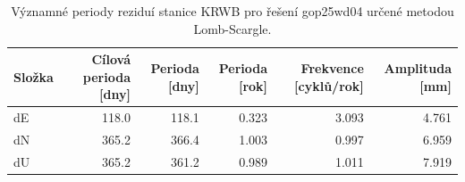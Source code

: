 \begin{table}[H]
\centering
\caption{Významné periody reziduí stanice KRWB pro řešení gop25wd04 určené metodou Lomb-Scargle.}
\label{tab:gop25wd04_stcd_krwb_detr_weighted_multiseg_spectral_lomb_scargle_significant_periods}
\begin{tabular}{lrrrrr}
\toprule
Složka & Cílová perioda [dny] & Perioda [dny] & Perioda [rok] & Frekvence [cyklů/rok] & Amplituda [mm] \\
\midrule
dE & 118.0 & 118.1 & 0.323 & 3.093 & 4.761 \\
dN & 365.2 & 366.4 & 1.003 & 0.997 & 6.959 \\
dU & 365.2 & 361.2 & 0.989 & 1.011 & 7.919 \\
\bottomrule
\end{tabular}
\end{table}
